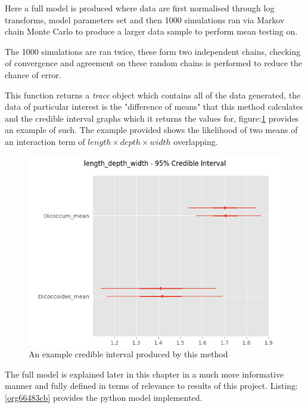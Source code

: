 \documentclass[11pt]{report}
\begin{document}
Here a full model is produced where data are first normalised through log transforms, model parameters set and then 1000 simulations ran via Markov chain Monte Carlo to produce a larger data sample to perform mean testing on.

The 1000 simulations are ran twice, these form two independent chains, checking of convergence and agreement on these random chains is performed to reduce the chance of error.

This function returns a \emph{trace} object which contains all of the data generated, the data of particular interest is the "difference of means" that this method calculates and the credible interval graphs which it returns the values for, figure:\ref{fig:orgf9c0df6} provides an example of such. The example provided shows the likelihood of two means of an interaction term of
\(length \times  depth \times width\) overlapping.

\begin{figure}[htbp]
\centering
\includegraphics[width=15cm]{./images/ci.png}
\caption{\label{fig:orgf9c0df6}
An example credible interval produced by this method}
\end{figure}


The full model is explained later in this chapter in a much more informative manner and fully defined in terms of relevance to results of this project. Listing:\ref{org66483cb} provides the python model implemented.
\end{document}
